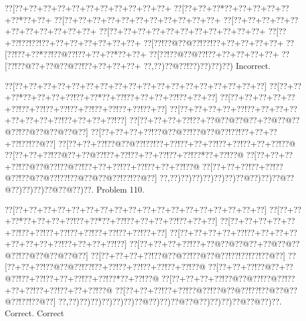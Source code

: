 \documentclass[a5paper]{article}
\begin{document}
\begin{center}
{\goo
\0??[\0??+\0??+\0??+\0??+\0??+\0??+\0??+\0??+\0??+\0??+\0??+
\0??[\0??+\0??+\0??*\0??+\0??+\0??+\0??+\0??+\0??*\0??+\0??+
\0??[\0??+\0??+\0??+\0??+\0??+\0??+\0??+\0??+\0??+\0??+\0??+
\0??[\0??+\0??+\0??+\0??+\0??+\0??+\0??+\0??+\0??+\0??+\0??+
\0??[\0??+\0??+\0??+\0??+\0??+\0??+\0??+\0??+\0??+\0??+\0??+
\0??[\0??+\0??!\0??!\0??!\0??+\0??+\0??+\0??+\0??+\0??+\0??+
\0??[\0??!\0??@\0??@\0??!\0??!\0??+\0??+\0??+\0??+\0??+
\0??[\0??!\0??+\0??*\0??!\0??@\0??!\0??+\0??+\0??*\0??+\0??+
\0??[\0??!\0??@\0??@\0??!\0??+\0??+\0??+\0??+\0??+
\0??[\0??!\0??@\0??+\0??@\0??@\0??!\0??+\0??+\0??+\0??+
\0??,\0??)\0??@\0??!\0??)\0??)\0??)\0??)
}
Incorrect. 

\end{center}
\newpage
\begin{center}
{\goo
\0??[\0??+\0??+\0??+\0??+\0??+\0??+\0??+\0??+\0??+\0??+\0??+\0??+\0??+\0??+\0??+\0??+\0??+\0??]
\0??[\0??+\0??+\0??*\0??+\0??+\0??+\0??!\0??+\0??*\0??+\0??!\0??+\0??+\0??+\0??!\0??+\0??+\0??]
\0??[\0??+\0??+\0??+\0??+\0??+\0??!\0??+\0??!\0??+\0??!\0??+\0??!\0??+\0??!\0??+\0??!\0??+\0??]
\0??[\0??+\0??+\0??+\0??+\0??!\0??+\0??+\0??+\0??+\0??+\0??+\0??+\0??!\0??+\0??+\0??+\0??!\0??]
\0??[\0??+\0??+\0??+\0??!\0??+\0??@\0??@\0??@\0??+\0??@\0??@\0??@\0??!\0??@\0??@\0??@\0??@\0??]
\0??[\0??+\0??+\0??+\0??!\0??@\0??@\0??!\0??@\0??@\0??!\0??!\0??+\0??+\0??+\0??!\0??!\0??@\0??]
\0??[\0??+\0??+\0??!\0??@\0??@\0??!\0??!\0??+\0??!\0??+\0??+\0??!\0??+\0??!\0??+\0??+\0??!\0??@
\0??[\0??+\0??+\0??!\0??@\0??+\0??@\0??!\0??+\0??!\0??+\0??+\0??!\0??+\0??!\0??*\0??+\0??!\0??@
\0??[\0??+\0??+\0??+\0??!\0??@\0??@\0??!\0??@\0??!\0??+\0??+\0??!\0??+\0??!\0??+\0??+\0??!\0??@
\0??[\0??+\0??+\0??!\0??+\0??!\0??@\0??!\0??@\0??@\0??!\0??!\0??@\0??@\0??@\0??!\0??!\0??@\0??]
\0??,\0??)\0??)\0??)\0??)\0??)\0??)\0??@\0??)\0??)\0??@\0??@\0??)\0??)\0??)\0??@\0??@\0??)\0??.
}
Problem 110.

\end{center}
\begin{center}
{\goo
\0??[\0??+\0??+\0??+\0??+\0??+\0??+\0??+\0??+\0??+\0??+\0??+\0??+\0??+\0??+\0??+\0??+\0??+\0??]
\0??[\0??+\0??+\0??*\0??+\0??+\0??+\0??!\0??+\0??*\0??+\0??!\0??+\0??+\0??+\0??!\0??+\0??+\0??]
\0??[\0??+\0??+\0??+\0??+\0??+\0??!\0??+\0??!\0??+\0??!\0??+\0??!\0??+\0??!\0??+\0??!\0??+\0??]
\0??[\0??+\0??+\0??+\0??+\0??!\0??+\0??+\0??+\0??+\0??+\0??+\0??+\0??!\0??+\0??+\0??+\0??!\0??]
\0??[\0??+\0??+\0??+\0??!\0??+\0??@\0??@\0??@\0??+\0??@\0??@\0??@\0??!\0??@\0??@\0??@\0??@\0??]
\0??[\0??+\0??+\0??+\0??!\0??@\0??@\0??!\0??@\0??@\0??!\0??!\0??!\0??!\0??@\0??]
\0??[\0??+\0??+\0??!\0??@\0??@\0??!\0??!\0??+\0??!\0??+\0??!\0??+\0??!\0??+\0??!\0??@
\0??[\0??+\0??+\0??!\0??@\0??+\0??@\0??!\0??+\0??!\0??+\0??+\0??!\0??+\0??!\0??*\0??+\0??!\0??@
\0??[\0??+\0??+\0??+\0??!\0??@\0??@\0??!\0??@\0??!\0??+\0??+\0??!\0??+\0??!\0??+\0??+\0??!\0??@
\0??[\0??+\0??+\0??!\0??+\0??!\0??@\0??!\0??@\0??@\0??!\0??!\0??@\0??@\0??@\0??!\0??!\0??@\0??]
\0??,\0??)\0??)\0??)\0??)\0??)\0??)\0??@\0??)\0??)\0??@\0??@\0??)\0??)\0??)\0??@\0??@\0??)\0??.
}
Correct. Correct

\end{center}
\end{document}
